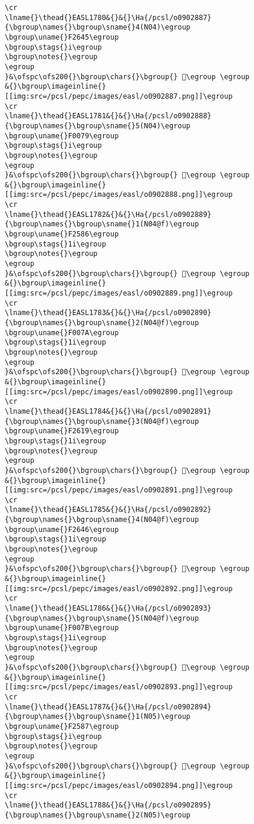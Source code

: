 \begin{verbatim}
\cr
\lname{}\thead{}EASL1780&{}&{}\Ha{/pcsl/o0902887}{\bgroup\names{}\bgroup\sname{}4(N04)\egroup
\bgroup\uname{}F2645\egroup
\bgroup\stags{}i\egroup
\bgroup\notes{}\egroup
\egroup
}&\ofspc\ofs200{}\bgroup\chars{}\bgroup{} 󲙅\egroup \egroup
&{}\bgroup\imageinline{}[[img:src=/pcsl/pepc/images/easl/o0902887.png]]\egroup
\cr
\lname{}\thead{}EASL1781&{}&{}\Ha{/pcsl/o0902888}{\bgroup\names{}\bgroup\sname{}5(N04)\egroup
\bgroup\uname{}F0079\egroup
\bgroup\stags{}i\egroup
\bgroup\notes{}\egroup
\egroup
}&\ofspc\ofs200{}\bgroup\chars{}\bgroup{} 󰁹\egroup \egroup
&{}\bgroup\imageinline{}[[img:src=/pcsl/pepc/images/easl/o0902888.png]]\egroup
\cr
\lname{}\thead{}EASL1782&{}&{}\Ha{/pcsl/o0902889}{\bgroup\names{}\bgroup\sname{}1(N04@f)\egroup
\bgroup\uname{}F2586\egroup
\bgroup\stags{}1i\egroup
\bgroup\notes{}\egroup
\egroup
}&\ofspc\ofs200{}\bgroup\chars{}\bgroup{} 󲖆\egroup \egroup
&{}\bgroup\imageinline{}[[img:src=/pcsl/pepc/images/easl/o0902889.png]]\egroup
\cr
\lname{}\thead{}EASL1783&{}&{}\Ha{/pcsl/o0902890}{\bgroup\names{}\bgroup\sname{}2(N04@f)\egroup
\bgroup\uname{}F007A\egroup
\bgroup\stags{}1i\egroup
\bgroup\notes{}\egroup
\egroup
}&\ofspc\ofs200{}\bgroup\chars{}\bgroup{} 󰁺\egroup \egroup
&{}\bgroup\imageinline{}[[img:src=/pcsl/pepc/images/easl/o0902890.png]]\egroup
\cr
\lname{}\thead{}EASL1784&{}&{}\Ha{/pcsl/o0902891}{\bgroup\names{}\bgroup\sname{}3(N04@f)\egroup
\bgroup\uname{}F2619\egroup
\bgroup\stags{}1i\egroup
\bgroup\notes{}\egroup
\egroup
}&\ofspc\ofs200{}\bgroup\chars{}\bgroup{} 󲘙\egroup \egroup
&{}\bgroup\imageinline{}[[img:src=/pcsl/pepc/images/easl/o0902891.png]]\egroup
\cr
\lname{}\thead{}EASL1785&{}&{}\Ha{/pcsl/o0902892}{\bgroup\names{}\bgroup\sname{}4(N04@f)\egroup
\bgroup\uname{}F2646\egroup
\bgroup\stags{}1i\egroup
\bgroup\notes{}\egroup
\egroup
}&\ofspc\ofs200{}\bgroup\chars{}\bgroup{} 󲙆\egroup \egroup
&{}\bgroup\imageinline{}[[img:src=/pcsl/pepc/images/easl/o0902892.png]]\egroup
\cr
\lname{}\thead{}EASL1786&{}&{}\Ha{/pcsl/o0902893}{\bgroup\names{}\bgroup\sname{}5(N04@f)\egroup
\bgroup\uname{}F007B\egroup
\bgroup\stags{}1i\egroup
\bgroup\notes{}\egroup
\egroup
}&\ofspc\ofs200{}\bgroup\chars{}\bgroup{} 󰁻\egroup \egroup
&{}\bgroup\imageinline{}[[img:src=/pcsl/pepc/images/easl/o0902893.png]]\egroup
\cr
\lname{}\thead{}EASL1787&{}&{}\Ha{/pcsl/o0902894}{\bgroup\names{}\bgroup\sname{}1(N05)\egroup
\bgroup\uname{}F2587\egroup
\bgroup\stags{}i\egroup
\bgroup\notes{}\egroup
\egroup
}&\ofspc\ofs200{}\bgroup\chars{}\bgroup{} 󲖇\egroup \egroup
&{}\bgroup\imageinline{}[[img:src=/pcsl/pepc/images/easl/o0902894.png]]\egroup
\cr
\lname{}\thead{}EASL1788&{}&{}\Ha{/pcsl/o0902895}{\bgroup\names{}\bgroup\sname{}2(N05)\egroup

\end{verbatim}
